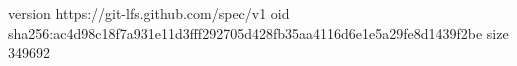 version https://git-lfs.github.com/spec/v1
oid sha256:ac4d98c18f7a931e11d3fff292705d428fb35aa4116d6e1e5a29fe8d1439f2be
size 349692
